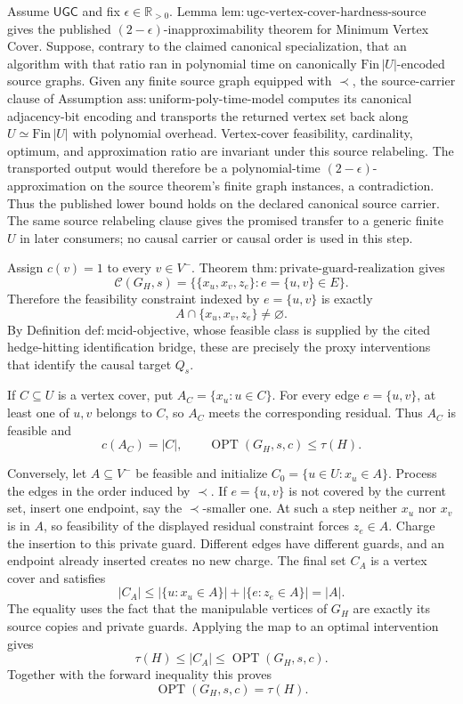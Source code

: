 Assume \(\mathsf{UGC}\) and fix
\(\epsilon\in\mathbb R_{>0}\).  Lemma
\(\mathrm{lem{:}ugc\mbox{-}vertex\mbox{-}cover\mbox{-}hardness\mbox{-}source}\)
gives the published \((2-\epsilon)\)-inapproximability theorem for Minimum
Vertex Cover.  Suppose, contrary to the claimed canonical specialization,
that an algorithm with that ratio ran in polynomial time on canonically
\(\mathrm{Fin}\,|U|\)-encoded source graphs.  Given any finite source graph
equipped with \(\prec\), the source-carrier clause of Assumption
\(\mathrm{ass{:}uniform\mbox{-}poly\mbox{-}time\mbox{-}model}\) computes
its canonical adjacency-bit encoding and transports the returned vertex set
back along \(U\simeq\mathrm{Fin}\,|U|\) with polynomial overhead.
Vertex-cover feasibility, cardinality, optimum, and approximation ratio are
invariant under this source relabeling.  The transported output would
therefore be a polynomial-time \((2-\epsilon)\)-approximation on the source
theorem's finite graph instances, a contradiction.  Thus the published
lower bound holds on the declared canonical source carrier.  The same source
relabeling clause gives the promised transfer to a generic finite \(U\) in
later consumers; no causal carrier or causal order is used in this step.

Assign \(c(v)=1\) to every \(v\in V^{-}\).  Theorem
\(\mathrm{thm{:}private\mbox{-}guard\mbox{-}realization}\) gives
\[
 \mathcal C(G_H,s)
 =\bigl\{\{x_u,x_v,z_e\}:e=\{u,v\}\in E\bigr\}.
\]
Therefore the feasibility constraint indexed by \(e=\{u,v\}\) is exactly
\[
 A\cap\{x_u,x_v,z_e\}\neq\varnothing.
\]
By Definition \(\mathrm{def{:}mcid\mbox{-}objective}\), whose feasible
class is supplied by the cited hedge-hitting identification bridge, these
are precisely the proxy interventions that identify the causal target
\(Q_s\).

If \(C\subseteq U\) is a vertex cover, put
\(A_C=\{x_u:u\in C\}\).  For every edge \(e=\{u,v\}\), at least one of
\(u,v\) belongs to \(C\), so \(A_C\) meets the corresponding residual.
Thus \(A_C\) is feasible and
\[
 c(A_C)=|C|,
 \qquad
 \operatorname{OPT}(G_H,s,c)\leq\tau(H).
\]

Conversely, let \(A\subseteq V^{-}\) be feasible and initialize
\(C_0=\{u\in U:x_u\in A\}\).  Process the edges in the order induced by
\(\prec\).  If \(e=\{u,v\}\) is not covered by the current set, insert one
endpoint, say the \(\prec\)-smaller one.  At such a step neither \(x_u\)
nor \(x_v\) is in \(A\), so feasibility of the displayed residual
constraint forces \(z_e\in A\).  Charge the insertion to this private
guard.  Different edges have different guards, and an endpoint already
inserted creates no new charge.  The final set \(C_A\) is a vertex cover and
satisfies
\[
 |C_A|
 \leq |\{u:x_u\in A\}|+|\{e:z_e\in A\}|
 =|A|.
\]
The equality uses the fact that the manipulable vertices of \(G_H\) are
exactly its source copies and private guards.  Applying the map to an
optimal intervention gives
\[
 \tau(H)\leq |C_A|\leq\operatorname{OPT}(G_H,s,c).
\]
Together with the forward inequality this proves
\[
 \operatorname{OPT}(G_H,s,c)=\tau(H).
\]

